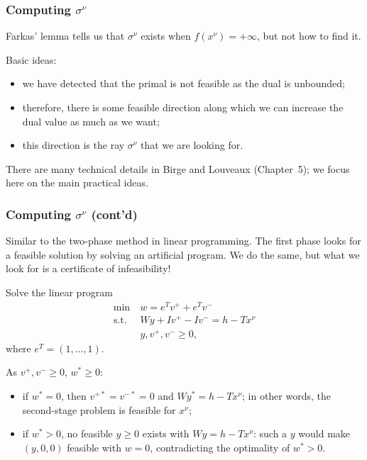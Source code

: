 \documentclass[aspectratio=169]{beamer}
\begin{document}
\begin{frame}
\frametitle{Computing $\sigma^{\nu}$}

Farkas' lemma tells us that $\sigma^{\nu}$ exists when $f(x^{\nu}) = +\infty$, but not how to find it.

\mbox{}

Basic ideas:
\begin{itemize}
\item
we have detected that the primal is not feasible as the dual is unbounded;
\item
therefore, there is some feasible direction along which we can increase the dual value as much as we want;
\item
this direction is the ray $\sigma^{\nu}$ that we are looking for.
\end{itemize}

\mbox{}

There are many technical details in Birge and Louveaux (Chapter~5); we focus here on the main practical ideas.

\end{frame}

\begin{frame}
\frametitle{Computing $\sigma^{\nu}$ (cont'd)}

Similar to the two-phase method in linear programming.
The first phase looks for a feasible solution by solving an artificial program.
We do the same, but what we look for is a certificate of infeasibility!

Solve the linear program
\begin{align*}
\min\ & w = e^Tv^+ + e^Tv^- \\
\text{s.t. } & Wy + Iv^+ - Iv^- = h - Tx^{\nu} \\
& y, v^+, v^- \geq 0,
\end{align*}
where $e^T = (1,\ldots,1)$.

As $v^+, v^- \geq 0$, $w^* \geq 0$:
\begin{itemize}
\item 
if $w^* = 0$, then $v^{+*} = v^{-*} = 0$ and $Wy^* = h - Tx^{\nu}$; in other words, the second-stage problem is feasible for $x^{\nu}$;
\item
if $w^* > 0$, no feasible $y \geq 0$ exists with $Wy = h - Tx^{\nu}$: such a $y$ would make $(y, 0, 0)$ feasible with $w = 0$, contradicting the optimality of $w^* > 0$.
\end{itemize}

\end{frame}
\end{document}
